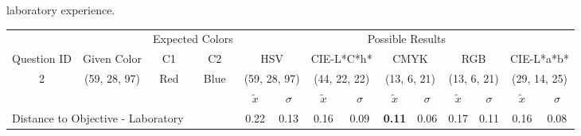 laboratory experience.
%
\begin{table}[H]
  \resizebox{\textwidth}{!} {
  \begin{tabular}{lccccccccccccc}
    \hline
    \multicolumn{1}{c}{}                              &                                      & \multicolumn{2}{c}{Expected Colors}                   & \multicolumn{10}{c}{Possible Results}                                                                                                                                                                                                                                                                                        \\ \cline{3-14}
    \multicolumn{1}{c}{\multirow{-2}{*}{Question ID}} & \multirow{-2}{*}{Given Color}        & C1                       & C2                         & \multicolumn{2}{c}{HSV}                                        & \multicolumn{2}{c}{CIE-L*C*h*}                                 & \multicolumn{2}{c}{CMYK}                                       & \multicolumn{2}{c}{RGB}                                        & \multicolumn{2}{c}{CIE-L*a*b*}                                 \\ \hline
    \multicolumn{1}{c}{2}                             & \cellcolor[HTML]{FF00FF}(59, 28, 97) & \multicolumn{1}{c|}{Red} & \multicolumn{1}{c|}{Blue}  & \multicolumn{2}{c|}{\cellcolor[HTML]{FF00FF}(59, 28, 97)}      & \multicolumn{2}{c|}{\cellcolor[HTML]{FB0080}(44, 22, 22)}       & \multicolumn{2}{c|}{\cellcolor[HTML]{800080}(13, 6, 21)}       & \multicolumn{2}{c|}{\cellcolor[HTML]{800080}(13, 6, 21)}       & \multicolumn{2}{c|}{\cellcolor[HTML]{CA0088}(29, 14, 25)}       \\ \hline
                                                      & \multicolumn{1}{l}{}                 & \multicolumn{1}{l}{}     & \multicolumn{1}{l}{}       & \multicolumn{1}{c}{$\tilde{x}$} & \multicolumn{1}{c}{$\sigma$} & \multicolumn{1}{c}{$\tilde{x}$} & \multicolumn{1}{c}{$\sigma$} & \multicolumn{1}{c}{$\tilde{x}$} & \multicolumn{1}{c}{$\sigma$} & \multicolumn{1}{c}{$\tilde{x}$} & \multicolumn{1}{c}{$\sigma$} & \multicolumn{1}{c}{$\tilde{x}$} & \multicolumn{1}{c}{$\sigma$} \\ \hline
    \multicolumn{4}{l}{Distance to Objective - Laboratory}                                                                                           & \multicolumn{1}{|c}{0.22}       & \multicolumn{1}{c|}{0.13}    & \multicolumn{1}{|c}{0.16}       & \multicolumn{1}{c|}{0.09}    & \multicolumn{1}{|c}{\textbf{0.11}}       & \multicolumn{1}{c|}{0.06}    & \multicolumn{1}{|c}{0.17}       & \multicolumn{1}{c|}{0.11}    & \multicolumn{1}{|c}{0.16}       & \multicolumn{1}{c|}{0.08}    \\

\end{tabular}}
\end{table}
